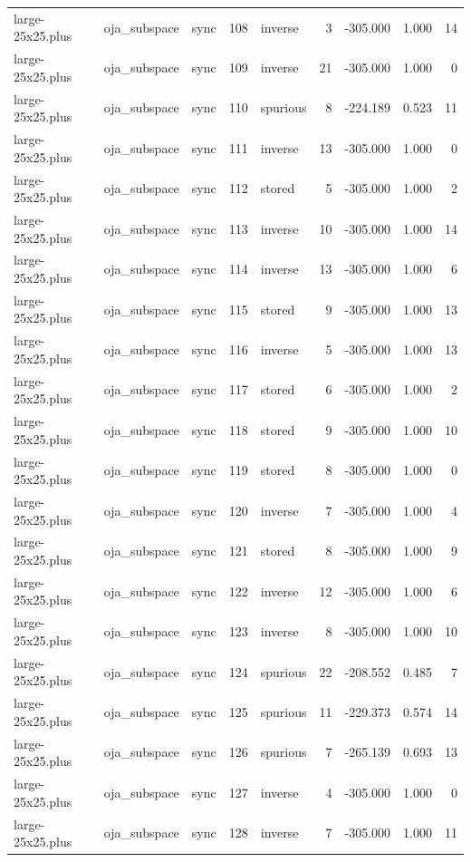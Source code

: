 \begin{tabular}{lllrlrrrr}
large-25x25.plus & oja\_subspace & sync & 108 & inverse & 3 & -305.000 & 1.000 & 14 \\
large-25x25.plus & oja\_subspace & sync & 109 & inverse & 21 & -305.000 & 1.000 & 0 \\
large-25x25.plus & oja\_subspace & sync & 110 & spurious & 8 & -224.189 & 0.523 & 11 \\
large-25x25.plus & oja\_subspace & sync & 111 & inverse & 13 & -305.000 & 1.000 & 0 \\
large-25x25.plus & oja\_subspace & sync & 112 & stored & 5 & -305.000 & 1.000 & 2 \\
large-25x25.plus & oja\_subspace & sync & 113 & inverse & 10 & -305.000 & 1.000 & 14 \\
large-25x25.plus & oja\_subspace & sync & 114 & inverse & 13 & -305.000 & 1.000 & 6 \\
large-25x25.plus & oja\_subspace & sync & 115 & stored & 9 & -305.000 & 1.000 & 13 \\
large-25x25.plus & oja\_subspace & sync & 116 & inverse & 5 & -305.000 & 1.000 & 13 \\
large-25x25.plus & oja\_subspace & sync & 117 & stored & 6 & -305.000 & 1.000 & 2 \\
large-25x25.plus & oja\_subspace & sync & 118 & stored & 9 & -305.000 & 1.000 & 10 \\
large-25x25.plus & oja\_subspace & sync & 119 & stored & 8 & -305.000 & 1.000 & 0 \\
large-25x25.plus & oja\_subspace & sync & 120 & inverse & 7 & -305.000 & 1.000 & 4 \\
large-25x25.plus & oja\_subspace & sync & 121 & stored & 8 & -305.000 & 1.000 & 9 \\
large-25x25.plus & oja\_subspace & sync & 122 & inverse & 12 & -305.000 & 1.000 & 6 \\
large-25x25.plus & oja\_subspace & sync & 123 & inverse & 8 & -305.000 & 1.000 & 10 \\
large-25x25.plus & oja\_subspace & sync & 124 & spurious & 22 & -208.552 & 0.485 & 7 \\
large-25x25.plus & oja\_subspace & sync & 125 & spurious & 11 & -229.373 & 0.574 & 14 \\
large-25x25.plus & oja\_subspace & sync & 126 & spurious & 7 & -265.139 & 0.693 & 13 \\
large-25x25.plus & oja\_subspace & sync & 127 & inverse & 4 & -305.000 & 1.000 & 0 \\
large-25x25.plus & oja\_subspace & sync & 128 & inverse & 7 & -305.000 & 1.000 & 11 \\

\end{tabular}
